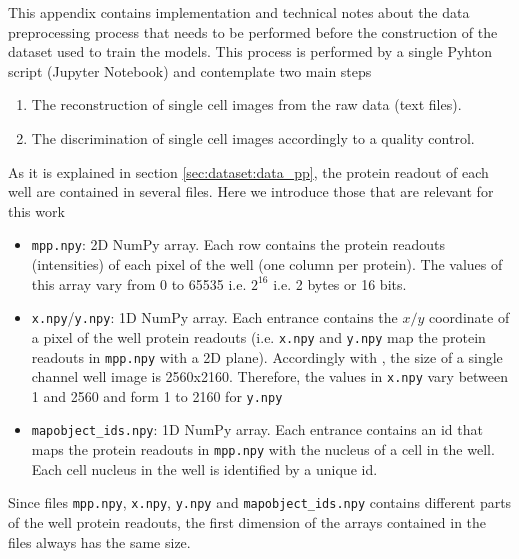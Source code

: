 
\glsresetall

This appendix contains implementation and technical notes about the data preprocessing process that needs to be performed before the construction of the dataset used to train the models. This process is performed by a single Pyhton script (Jupyter Notebook) and contemplate two main steps

\begin{enumerate}
  \item The reconstruction of single cell images from the raw data (text files).
  \item The discrimination of single cell images accordingly to a quality control.
\end{enumerate}

As it is explained in section \ref{sec:dataset:data_pp}, the protein readout of each well are contained in several files. Here we introduce those that are relevant for this work

\begin{itemize}
  \item \texttt{mpp.npy}: 2D NumPy array. Each row contains the protein readouts (intensities) of each pixel of the well (one column per protein). The values of this array vary from 0 to 65535 i.e. $2^{16}$ i.e. 2 bytes or 16 bits.
  \item \texttt{x.npy}/\texttt{y.npy}: 1D NumPy array. Each entrance contains the $x/y$ coordinate of a pixel of the well protein readouts (i.e. \texttt{x.npy} and \texttt{y.npy} map the protein readouts in \texttt{mpp.npy} with a 2D plane). Accordingly with \cite{Guteaar7042}, the size of a single channel well image is 2560x2160. Therefore, the values in \texttt{x.npy} vary between 1 and 2560 and form 1 to 2160 for \texttt{y.npy}
  \item \texttt{mapobject\_ids.npy}: 1D NumPy array. Each entrance contains an id that maps the protein readouts in \texttt{mpp.npy} with the nucleus of a cell in the well. Each cell nucleus in the well is identified by a unique id.
\end{itemize}

Since files \texttt{mpp.npy}, \texttt{x.npy}, \texttt{y.npy} and \texttt{mapobject\_ids.npy} contains different parts of the well protein readouts, the first dimension of the arrays contained in the files always has the same size.

